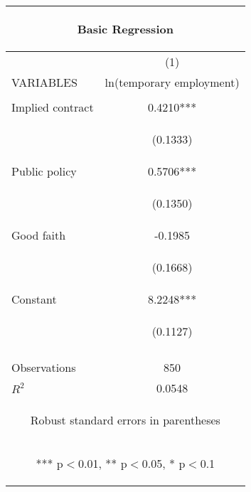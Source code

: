 \begin{center}
\begin{tabular}{lc}
\multicolumn{2}{c}{\begin{large}Basic Regression\label{2b}\end{large}} \\ \hline
 & (1) \\
VARIABLES & ln(temporary employment) \\ \hline
\vspace{4pt} & \begin{footnotesize}\end{footnotesize} \\
Implied contract & 0.4210*** \\
\vspace{4pt} & \begin{footnotesize}(0.1333)\end{footnotesize} \\
Public policy & 0.5706*** \\
\vspace{4pt} & \begin{footnotesize}(0.1350)\end{footnotesize} \\
Good faith & -0.1985 \\
\vspace{4pt} & \begin{footnotesize}(0.1668)\end{footnotesize} \\
Constant & 8.2248*** \\
 & \begin{footnotesize}(0.1127)\end{footnotesize} \\
\vspace{4pt} & \begin{footnotesize}\end{footnotesize} \\
Observations & 850 \\
 $R^2$ & 0.0548 \\ \hline
\multicolumn{2}{c}{\begin{footnotesize} Robust standard errors in parentheses\end{footnotesize}} \\
\multicolumn{2}{c}{\begin{footnotesize} *** p$<$0.01, ** p$<$0.05, * p$<$0.1\end{footnotesize}} \\
\end{tabular}
\end{center}
